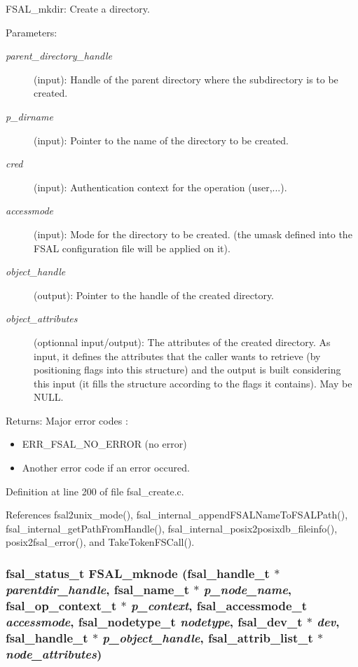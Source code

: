 FSAL\_\-mkdir: Create a directory.

\begin{Desc}
\item[Parameters:]
\begin{description}
\item[{\em parent\_\-directory\_\-handle}](input): Handle of the parent directory where the subdirectory is to be created. \item[{\em p\_\-dirname}](input): Pointer to the name of the directory to be created. \item[{\em cred}](input): Authentication context for the operation (user,...). \item[{\em accessmode}](input): Mode for the directory to be created. (the umask defined into the FSAL configuration file will be applied on it). \item[{\em object\_\-handle}](output): Pointer to the handle of the created directory. \item[{\em object\_\-attributes}](optionnal input/output): The attributes of the created directory. As input, it defines the attributes that the caller wants to retrieve (by positioning flags into this structure) and the output is built considering this input (it fills the structure according to the flags it contains). May be NULL.\end{description}
\end{Desc}
\begin{Desc}
\item[Returns:]Major error codes :\begin{itemize}
\item ERR\_\-FSAL\_\-NO\_\-ERROR (no error)\item Another error code if an error occured. \end{itemize}
\end{Desc}


Definition at line 200 of file fsal\_\-create.c.

References fsal2unix\_\-mode(), fsal\_\-internal\_\-append\-FSALName\-To\-FSALPath(), fsal\_\-internal\_\-get\-Path\-From\-Handle(), fsal\_\-internal\_\-posix2posixdb\_\-fileinfo(), posix2fsal\_\-error(), and Take\-Token\-FSCall().
\subsubsection{\setlength{\rightskip}{0pt plus 5cm}fsal\_\-status\_\-t FSAL\_\-mknode (fsal\_\-handle\_\-t $\ast$ {\em parentdir\_\-handle}, fsal\_\-name\_\-t $\ast$ {\em p\_\-node\_\-name}, fsal\_\-op\_\-context\_\-t $\ast$ {\em p\_\-context}, fsal\_\-accessmode\_\-t {\em accessmode}, fsal\_\-nodetype\_\-t {\em nodetype}, fsal\_\-dev\_\-t $\ast$ {\em dev}, fsal\_\-handle\_\-t $\ast$ {\em p\_\-object\_\-handle}, fsal\_\-attrib\_\-list\_\-t $\ast$ {\em node\_\-attributes})}\label{fsal__create_8c_a3}


